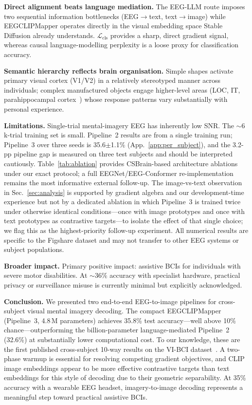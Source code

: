 \documentclass{article}
\begin{document}
\textbf{Direct alignment beats language mediation.} The EEG-LLM route imposes two sequential information bottlenecks (EEG$\to$text, text$\to$image) while EEGCLIPMapper operates directly in the visual embedding space Stable Diffusion already understands. $\mathcal{L}_\mathrm{cls}$ provides a sharp, direct gradient signal, whereas causal language-modelling perplexity is a loose proxy for classification accuracy.

\textbf{Semantic hierarchy reflects brain organisation.} Simple shapes activate primary visual cortex (V1/V2) in a relatively stereotyped manner across individuals; complex manufactured objects engage higher-level areas (LOC, IT, parahippocampal cortex~\citep{haxby2001distributed,dijkstra2019differential}) whose response patterns vary substantially with personal experience.

\textbf{Limitations.} Single-trial mental-imagery EEG has inherently low SNR. The $\sim$6\,k-trial training set is small. Pipeline~2 results are from a single training run; Pipeline~3 over three seeds is 35.6$\pm$1.1\% (App.~\ref{app:per_subject}), and the 3.2-pp pipeline gap is measured on three test subjects and should be interpreted cautiously. Table~\ref{tab:ablation} provides CSBrain-based architecture ablations under our exact protocol; a full EEGNet/EEG-Conformer re-implementation remains the most informative external follow-up. The image-vs-text observation in Sec.~\ref{sec:analysis} is supported by gradient algebra and our development-time experience but not by a dedicated ablation in which Pipeline~3 is trained twice under otherwise identical conditions---once with image prototypes and once with text prototypes as contrastive targets---to isolate the effect of that single choice; we flag this as the highest-priority follow-up experiment. All numerical results are specific to the Figshare dataset and may not transfer to other EEG systems or subject populations.

\textbf{Broader impact.} Primary positive impact: assistive BCIs for individuals with severe motor disabilities. At $\sim$36\% accuracy with specialist hardware, practical privacy or surveillance misuse is currently minimal but explicitly acknowledged.

\textbf{Conclusion.} We presented two end-to-end EEG-to-image pipelines for cross-subject visual mental imagery decoding. The compact EEGCLIPMapper (Pipeline~3, 4.8\,M parameters) achieves 35.8\% test accuracy---well above 10\% chance---outperforming the billion-parameter language-mediated Pipeline~2 (32.6\%) at substantially lower computational cost. To our knowledge, these are the first published cross-subject 10-way results on the VI-BCI dataset~\citep{figshare_eeg,figshare_paper}. A two-phase warmup is essential for resolving competing gradient objectives, and CLIP image embeddings appear to be more effective contrastive targets than text embeddings for this style of decoding due to their geometric separability. At 35\% accuracy with a wearable EEG headset, imagery-to-image decoding represents a meaningful step toward practical assistive BCIs.
\end{document}
